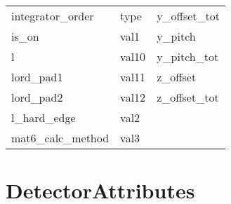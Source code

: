 \begin{tabular}{lll}
integrator_order            & type                        & y_offset_tot                \\
is_on                       & val1                        & y_pitch                     \\
l                           & val10                       & y_pitch_tot                 \\
lord_pad1                   & val11                       & z_offset                    \\
lord_pad2                   & val12                       & z_offset_tot                \\
l_hard_edge                 & val2                        &                             \\
mat6_calc_method            & val3                        &                             \\
 \bottomrule
 \end{tabular}
 \vfill
 
 \section{DetectorAttributes}
 \label{s:list.detector}
 
